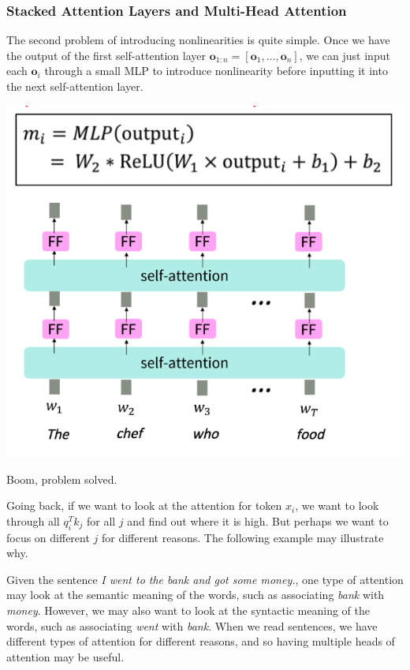 \documentclass{article}
\begin{document}
  \subsubsection{Stacked Attention Layers and Multi-Head Attention}

    The second problem of introducing nonlinearities is quite simple. Once we have the output of the first self-attention layer $\mathbf{o}_{1:n} = [\mathbf{o}_1, \ldots, \mathbf{o}_n]$, we can just input each $\mathbf{o}_i$ through a small MLP to introduce nonlinearity before inputting it into the next self-attention layer. 

    \begin{center}
      \includegraphics[scale=0.4]{img/stacked_self_attention_layers.png}
    \end{center}

    Boom, problem solved. 

    Going back, if we want to look at the attention for token $x_i$, we want to look through all $q_i^T k_j$ for all $j$ and find out where it is high. But perhaps we want to focus on different $j$ for different reasons. The following example may illustrate why. 

    \begin{example}
      Given the sentence \textit{I went to the bank and got some money.}, one type of attention may look at the semantic meaning of the words, such as associating \textit{bank} with \textit{money}. However, we may also want to look at the syntactic meaning of the words, such as associating \textit{went} with \textit{bank}. When we read sentences, we have different types of attention for different reasons, and so having multiple heads of attention may be useful. 
    \end{example}
\end{document}
